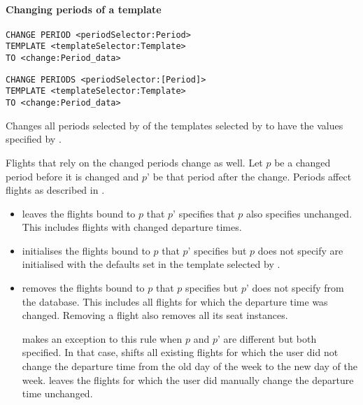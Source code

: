 \paragraph{Changing periods of a template}
\begin{operation}
  \label{op:change_periods}
  \begin{lstlisting}
CHANGE PERIOD <periodSelector:Period>
TEMPLATE <templateSelector:Template>
TO <change:Period_data>
  \end{lstlisting}
\end{operation}
\begin{operation}
  \label{op:change_periods}
  \begin{lstlisting}
CHANGE PERIODS <periodSelector:[Period]>
TEMPLATE <templateSelector:Template>
TO <change:Period_data>
  \end{lstlisting}
\end{operation}
Changes all periods selected by  of the templates selected
by  to have the values specified by .

Flights that rely on the changed periods change as well. Let $p$ be a changed
period before it is changed and $p’$ be that period after the change. Periods
affect flights as described in .

\begin{itemize}
  \item {} leaves the flights bound to $p$ that $p’$
    specifies that $p$ also specifies unchanged. This includes flights with
    changed departure times.
  \item {} initialises the flights bound to $p$ that $p’$
    specifies but $p$ does not specify are initialised with the defaults set in
    the template selected by .
  \item {} removes the flights bound to $p$ that $p$
    specifies but $p’$ does not specify from the database. This includes all
    flights for which the departure time was changed. Removing a flight also
    removes all its seat instances.

     makes an exception to this rule when
    $p$ and $p’$ are different but both specified. In
    that case,  shifts all existing flights for which
    the user did not change the departure time from the old day of the
    week to the new day of the week.  leaves the
    flights for which the user did manually change the departure time unchanged.
\end{itemize}

